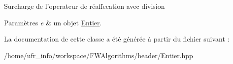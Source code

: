 Surcharge de l'operateur de réaffecation avec division 
\begin{DoxyParams}{Paramètres}
{\em e} & un objet \hyperlink{class_entier}{Entier}. \\
\hline
\end{DoxyParams}


La documentation de cette classe a été générée à partir du fichier suivant \-:\begin{DoxyCompactItemize}
\item 
/home/ufr\-\_\-info/workspace/\-F\-W\-Algorithms/header/Entier.\-hpp\end{DoxyCompactItemize}

